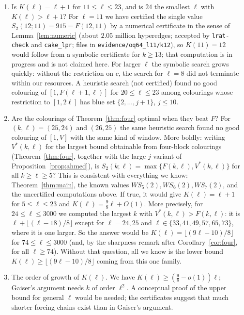 \documentclass[11pt]{amsart}
\theoremstyle{definition}
\newcommand{\F}{F}
\newcommand{\Stwo}{S_2}
\begin{document}
\begin{enumerate}[label=\arabic*.]
\item Is $K(\ell)=\ell+1$ for $11\le\ell\le23$, and is $24$ the smallest $\ell$ with $K(\ell)>\ell+1$? For $\ell=11$ we have certified the single value $\Stwo(12;11)=915=\F(12,11)$ by a numerical certificate in the sense of Lemma~\ref{lem:numeric} (about $2.05$ million hyperedges; accepted by \texttt{lrat-check} and \texttt{cake\_lpr}; files in \texttt{evidence/oq64\_l11/k12}), so $K(11)=12$ would follow from a symbolic certificate for $k\ge13$; that computation is in progress and is not claimed here. For larger $\ell$ the symbolic search grows quickly: without the restriction on $c$, the search for $\ell=8$ did not terminate within our resources. A heuristic search (not certified) found no good colouring of $[1,\F(\ell+1,\ell)]$ for $20\le\ell\le23$ among colourings whose restriction to $[1,2\ell]$ has blue set $\{2,\dots,j+1\}$, $j\le10$.
\item Are the colourings of Theorem~\ref{thm:four} optimal when they beat $\F$? For $(k,\ell)=(25,24)$ and $(26,25)$ the same heuristic search found no good colouring of $[1,V]$ with the same kind of window. More boldly: writing $V^*(k,\ell)$ for the largest bound obtainable from four-block colourings (Theorem~\ref{thm:four}, together with the large-$j$ variant of Proposition~\ref{prop:ahmed}), is $\Stwo(k;\ell)=\max\{\F(k,\ell),V^*(k,\ell)\}$ for all $k\ge\ell\ge5$? This is consistent with everything we know: Theorem~\ref{thm:main}, the known values $WS_5(2),WS_6(2),WS_7(2)$, and the uncertified computations above. If true, it would give $K(\ell)=\ell+1$ for $5\le\ell\le23$ and $K(\ell)=\tfrac98\ell+O(1)$. More precisely, for $24\le\ell\le3000$ we computed the largest $k$ with $V^*(k,\ell)>\F(k,\ell)$: it is $\ell+\lfloor(\ell-18)/8\rfloor$ except for $\ell=24,25$ and $\ell\in\{33,41,49,57,65,73\}$, where it is one larger. So the answer would be $K(\ell)=\lfloor(9\ell-10)/8\rfloor$ for $74\le\ell\le3000$ (and, by the sharpness remark after Corollary~\ref{cor:four}, for all $\ell\ge74$). Without that question, all we know is the lower bound $K(\ell)\ge\lfloor(9\ell-10)/8\rfloor$ coming from this one family.
\item The order of growth of $K(\ell)$. We have $K(\ell)\ge(\tfrac98-o(1))\ell$; Gaiser's argument needs $k$ of order $\ell^2$. A conceptual proof of the upper bound for general $\ell$ would be needed; the certificates suggest that much shorter forcing chains exist than in Gaiser's argument.

\end{enumerate}
\end{document}
